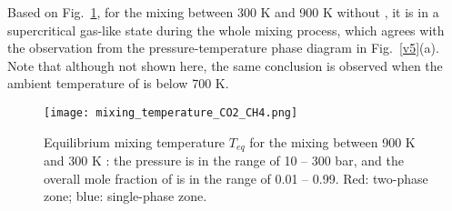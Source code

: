 Based on Fig.~\ref{v7}, for the mixing between 300 K  and 900 K  without , it is in a supercritical gas-like state during the whole mixing process, which agrees with the observation from the pressure-temperature phase diagram in Fig.~\ref{v5}(a). Note that although not shown here, the same conclusion is observed when the ambient temperature of  is below 700 K.
\begin{figure}[htb]
    \begin{center}
        \texttt{[image: mixing\_temperature\_CO2\_CH4.png]}
    \end{center}
    \caption{Equilibrium mixing temperature $T_{eq}$ for the mixing between 900 K  and 300 K : the pressure is in the range of 10 – 300 bar, and the overall mole fraction of  is in the range of 0.01 – 0.99. Red: two-phase zone; blue: single-phase zone.}
    \label{v7}
\end{figure}

